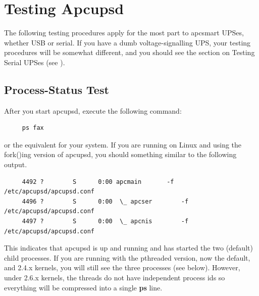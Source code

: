 {\label{Testing-Apcupsd}

\section*{Testing Apcupsd}

\label{index-Testing-84}
The following testing procedures apply for the most part to apcsmart UPSes,
whether USB or serial.  If you have a dumb voltage-signalling UPS, your
testing procedures will be somewhat different, and you should see the section
on Testing Serial UPSes (see 
). 

\label{Process_002dStatus-Test}

\subsection*{Process-Status Test}

\label{index-Process-Status-Testing-85}
\label{index-Testing_002c-Process-Status-86}
After you start apcupsd, execute the following command: 

\footnotesize
\begin{verbatim}
     ps fax
\end{verbatim}
\normalsize

or the equivalent for your system. If you are running on Linux and using the
fork()ing version of apcupsd, you should something similar to the following
output. 

\footnotesize
\begin{verbatim}
     4492 ?        S      0:00 apcmain       -f /etc/apcupsd/apcupsd.conf
     4496 ?        S      0:00  \_ apcser        -f /etc/apcupsd/apcupsd.conf
     4497 ?        S      0:00  \_ apcnis        -f /etc/apcupsd/apcupsd.conf
\end{verbatim}
\normalsize

This indicates that apcupsd is up and running and has started the two
(default) child processes. If you are running with the pthreaded version, now
the default, and 2.4.x kernels, you will still see the three processes (see
below).  However, under 2.6.x kernels, the threads do not have independent
process ids so everything will be compressed into a single {\bf ps} line.  

}
